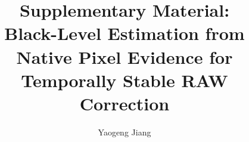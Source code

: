 
\usepackage{xr}


\title{Supplementary Material:\\Black-Level Estimation from Native Pixel Evidence for Temporally Stable RAW Correction}
\author{Yaogeng Jiang}
\maketitle
\renewcommand{\thefigure}{S\arabic{figure}}
\appendices


